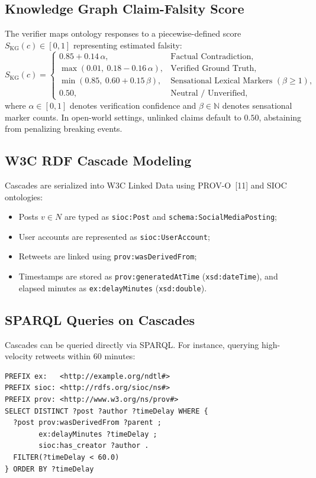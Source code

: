 \documentclass[10pt,twocolumn,a4paper]{article}
\newcommand{\SKG}{S_{\mathrm{KG}}}
\begin{document}
\subsection{Knowledge Graph Claim-Falsity Score}
The verifier maps ontology responses to a piecewise-defined score $\SKG(c)\in[0,1]$ representing estimated falsity:
\begin{equation}
\SKG(c)=
\begin{cases}
0.85+0.14\,\alpha, & \text{Factual Contradiction},\\
\max(0.01,\ 0.18-0.16\,\alpha), & \text{Verified Ground Truth},\\
\min(0.85,\ 0.60+0.15\,\beta), & \text{Sensational Lexical Markers } (\beta \ge 1),\\
0.50, & \text{Neutral / Unverified},
\end{cases}
\end{equation}
where $\alpha\in[0,1]$ denotes verification confidence and $\beta\in\mathbb{N}$ denotes sensational marker counts. In open-world settings, unlinked claims default to $0.50$, abstaining from penalizing breaking events.
 
\subsection{W3C RDF Cascade Modeling}
Cascades are serialized into W3C Linked Data using PROV-O~[11] and SIOC ontologies:
\begin{itemize}
  \item Posts $v\in N$ are typed as \texttt{sioc:Post} and \texttt{schema:SocialMediaPosting};
  \item User accounts are represented as \texttt{sioc:UserAccount};
  \item Retweets are linked using \texttt{prov:wasDerivedFrom};
  \item Timestamps are stored as \texttt{prov:generatedAtTime} (\texttt{xsd:dateTime}), and elapsed minutes as \texttt{ex:delayMinutes} (\texttt{xsd:double}).
\end{itemize}
 
\subsection{SPARQL Queries on Cascades}
Cascades can be queried directly via SPARQL. For instance, querying high-velocity retweets within 60 minutes:
\begin{lstlisting}[caption={SPARQL cascade query for early retweets.},label={lst:cascade}]
PREFIX ex:   <http://example.org/ndtl#>
PREFIX sioc: <http://rdfs.org/sioc/ns#>
PREFIX prov: <http://www.w3.org/ns/prov#>
SELECT DISTINCT ?post ?author ?timeDelay WHERE {
  ?post prov:wasDerivedFrom ?parent ;
        ex:delayMinutes ?timeDelay ;
        sioc:has_creator ?author .
  FILTER(?timeDelay < 60.0)
} ORDER BY ?timeDelay
\end{lstlisting}
 
\end{document}

